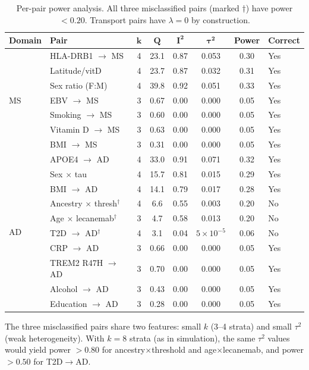 \documentclass{article}
\begin{document}
\begin{table}[h]
\centering
\caption{Per-pair power analysis. All three misclassified pairs (marked $\dagger$) have power $< 0.20$. Transport pairs have $\lambda = 0$ by construction.}
\label{tab:power-full}
\small
\begin{tabular}{@{}llcccccl@{}}
\toprule
\textbf{Domain} & \textbf{Pair} & $\boldsymbol{k}$ & $\boldsymbol{Q}$ & $\boldsymbol{I^2}$ & $\boldsymbol{\tau^2}$ & \textbf{Power} & \textbf{Correct} \\
\midrule
\multirow{7}{*}{MS}
& HLA-DRB1 $\to$ MS & 4 & 23.1 & 0.87 & 0.053 & 0.30 & Yes \\
& Latitude/vitD & 4 & 23.7 & 0.87 & 0.032 & 0.31 & Yes \\
& Sex ratio (F:M) & 4 & 39.8 & 0.92 & 0.051 & 0.33 & Yes \\
& EBV $\to$ MS & 3 & 0.67 & 0.00 & 0.000 & 0.05 & Yes \\
& Smoking $\to$ MS & 3 & 0.60 & 0.00 & 0.000 & 0.05 & Yes \\
& Vitamin D $\to$ MS & 3 & 0.63 & 0.00 & 0.000 & 0.05 & Yes \\
& BMI $\to$ MS & 3 & 0.31 & 0.00 & 0.000 & 0.05 & Yes \\
\midrule
\multirow{10}{*}{AD}
& APOE4 $\to$ AD & 4 & 33.0 & 0.91 & 0.071 & 0.32 & Yes \\
& Sex $\times$ tau & 4 & 15.7 & 0.81 & 0.015 & 0.29 & Yes \\
& BMI $\to$ AD & 4 & 14.1 & 0.79 & 0.017 & 0.28 & Yes \\
& Ancestry $\times$ thresh$^\dagger$ & 4 & 6.6 & 0.55 & 0.003 & 0.20 & No \\
& Age $\times$ lecanemab$^\dagger$ & 3 & 4.7 & 0.58 & 0.013 & 0.20 & No \\
& T2D $\to$ AD$^\dagger$ & 4 & 3.1 & 0.04 & $5 \times 10^{-5}$ & 0.06 & No \\
& CRP $\to$ AD & 3 & 0.66 & 0.00 & 0.000 & 0.05 & Yes \\
& TREM2 R47H $\to$ AD & 3 & 0.70 & 0.00 & 0.000 & 0.05 & Yes \\
& Alcohol $\to$ AD & 3 & 0.43 & 0.00 & 0.000 & 0.05 & Yes \\
& Education $\to$ AD & 3 & 0.28 & 0.00 & 0.000 & 0.05 & Yes \\
\bottomrule
\end{tabular}
\end{table}

The three misclassified pairs share two features: small $k$ (3--4 strata) and small $\tau^2$ (weak heterogeneity). With $k = 8$ strata (as in simulation), the same $\tau^2$ values would yield power $> 0.80$ for ancestry$\times$threshold and age$\times$lecanemab, and power $> 0.50$ for T2D$\to$AD.
\end{document}
